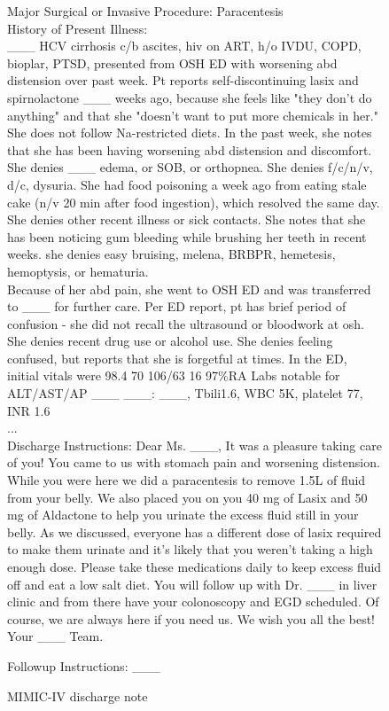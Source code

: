 \begin{figure}[!ht]
\begin{tcolorbox}
Major Surgical or Invasive Procedure:
Paracentesis
\\
History of Present Illness: \\
\_\_\_ HCV cirrhosis c/b ascites, hiv on ART, h/o IVDU, COPD, 
bioplar, PTSD, presented from OSH ED with worsening abd 
distension over past week.  
Pt reports self-discontinuing lasix and spirnolactone \_\_\_ weeks 
ago, because she feels like "they don't do anything" and that 
she "doesn't want to put more chemicals in her." She does not 
follow Na-restricted diets. In the past week, she notes that she 
has been having worsening abd distension and discomfort. She 
denies \_\_\_ edema, or SOB, or orthopnea. She denies f/c/n/v, d/c,
dysuria. She had food poisoning a week ago from eating stale 
cake (n/v 20 min after food ingestion), which resolved the same 
day. She denies other recent illness or sick contacts. She notes 
that she has been noticing gum bleeding while brushing her teeth 
in recent weeks. she denies easy bruising, melena, BRBPR, 
hemetesis, hemoptysis, or hematuria.  \\
Because of her abd pain, she went to OSH ED and was transferred 
to \_\_\_ for further care. Per ED report, pt has brief period of 
confusion - she did not recall the ultrasound or bloodwork at 
osh. She denies recent drug use or alcohol use. She denies 
feeling confused, but reports that she is forgetful at times.  
In the ED, initial vitals were 98.4 70 106/63 16 97\%RA  
Labs notable for ALT/AST/AP \_\_\_ \_\_\_: \_\_\_, 
Tbili1.6, WBC 5K, platelet 77, INR 1.6  \\
...\\
Discharge Instructions:
Dear Ms. \_\_\_,
It was a pleasure taking care of you! You came to us with 
stomach pain and worsening distension. While you were here we 
did a paracentesis to remove 1.5L of fluid from your belly. We 
also placed you on you 40 mg of Lasix and 50 mg of Aldactone to 
help you urinate the excess fluid still in your belly. As we 
discussed, everyone has a different dose of lasix required to 
make them urinate and it's likely that you weren't taking a high 
enough dose. Please take these medications daily to keep excess 
fluid off and eat a low salt diet. You will follow up with Dr. 
\_\_\_ in liver clinic and from there have your colonoscopy 
and EGD scheduled. Of course, we are always here if you need us. 
We wish you all the best!
Your \_\_\_ Team.  
 
Followup Instructions:
\_\_\_

\end{tcolorbox}
    \caption{MIMIC-IV discharge note}
    \label{mimic_notes}
\end{figure}